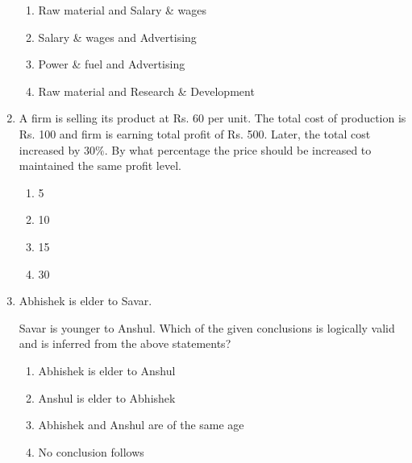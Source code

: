 \documentclass[journal]{IEEEtran}
\begin{document}
\begin{enumerate}
			\begin{enumerate}
   \item Raw material and Salary \& wages
\item Salary \& wages and Advertising
\item  Power \& fuel and Advertising
\item Raw material and Research \& Development
 \end{enumerate}
	
  \item   A firm is selling its product at Rs. 60 per unit. The total cost of production is Rs. 100 and firm is earning total profit of Rs. 500. Later, the total cost increased by $30 \%$. By what percentage the price should be increased to maintained the same profit level.
  

\begin{multicols}{4}
			\begin{enumerate}
   \item 5
\item 10
\item15
\item 30
\end{enumerate}
		\end{multicols}
  \item   Abhishek is elder to Savar.

Savar is younger to Anshul.
Which of the given conclusions is logically valid and is inferred from the above statements?
 
			\begin{enumerate}
   \item Abhishek is elder to Anshul
\item Anshul is elder to Abhishek
\item  Abhishek and Anshul are of the same age
\item No conclusion follows
  \end{enumerate}
		
 \end{enumerate}
\end{document}
